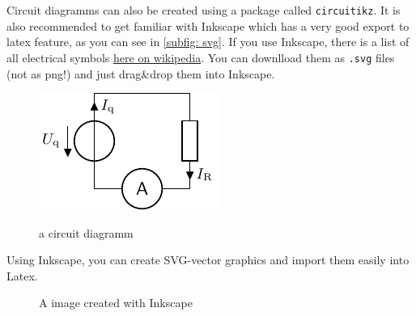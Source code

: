 \documentclass[	%
		fontsize=11pt,  %
		a4paper,	    %
		twoside,		%
		english,		%
		sans,			%
		f1,				%
	]{HsH-report}		%
\begin{document}
		\pagebreak
		Circuit diagramms can also be created using a package called \lstinline{circuitikz}. It is also recommended to get familiar with Inkscape which
		has a very good export to latex feature, as you can see in \autoref{subfig: svg}. If you use Inkscape, there is a list of all electrical
		symbols \href{https://de.wikipedia.org/wiki/Liste_der_Schaltzeichen_(Elektrik/Elektronik)}{here on wikipedia}. You can downlload them as
		\lstinline{.svg} files (not as png!) and just drag\&drop them into Inkscape.
		\begin{figure}
			\includegraphics{crc/exampleCircuit.pdf}
			\label{subfig: circuit}
			\caption{a circuit diagramm}
		\end{figure}

		\pagebreak
		Using Inkscape, you can create SVG-vector graphics and import them easily into Latex.
		\begin{figure}
			\def\svgwidth{0.3\textwidth} %
			\graphicspath{{svg/}} %
			\caption{A image created with Inkscape}
			\label{subfig: svg}
		\end{figure}
		\enlargethispage{4\baselineskip}
\end{document}
